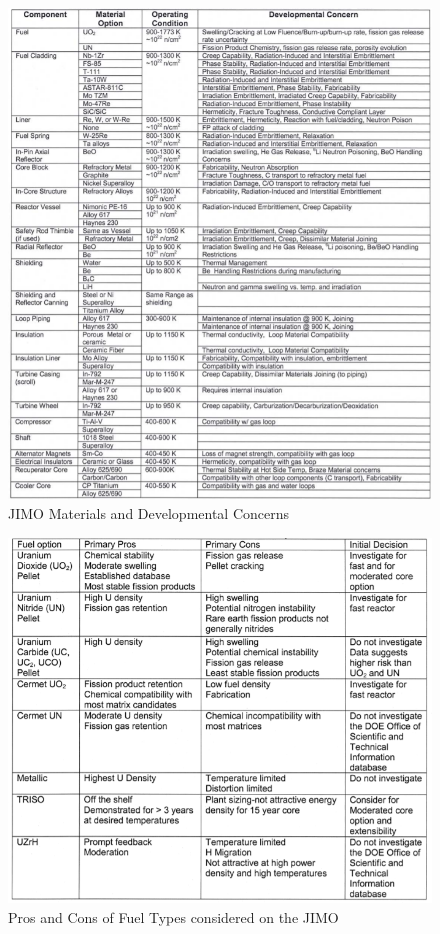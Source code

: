 \documentclass{article}
\begin{document}
\begin{figure}[]
	\centering
	\includegraphics[height=0.85\textheight]{fig/appT}
	\caption[JIMO Materials and Developmental Concerns]{JIMO Materials and Developmental Concerns~\cite{wollman2006prometheus}}
	\label{appT}
\end{figure}

\begin{figure}[]
	\centering
	\includegraphics[height=0.45\textheight]{fig/appU}
	\caption[Pros and Cons of Fuel Types considered on the JIMO]{Pros and Cons of Fuel Types considered on the JIMO~\cite{wollman2006prometheus}}
	\label{appU}
\end{figure}
\end{document}
